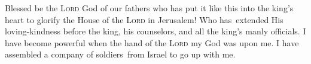 \begin{inparaenum}\setcounter{enumi}{26}
     Blessed be the \textsc{Lord} God of our fathers who has put it like this into the king's heart to glorify the House of the \textsc{Lord} in Jerusalem!%
     Who has\understood\ extended His loving-kindness before the king, his counselors, and all the king's manly officials. I have become powerful when the hand of the \textsc{Lord} my God was upon me. I have assembled a company of soldiers\understood\ from Israel to go up with me.%
\end{inparaenum}
